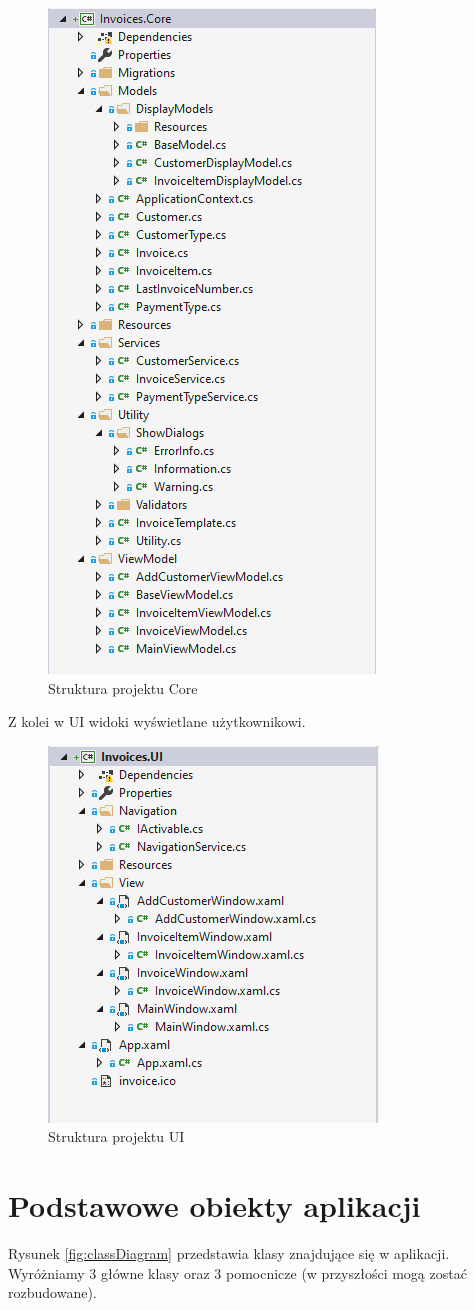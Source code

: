 \begin{figure}[ht!]
\centering
  \includegraphics[width=0.5\linewidth]{Rysunki/core.png}
  \caption{Struktura projektu Core}
  \label{fig:Core}
\end{figure}

Z kolei w UI widoki wyświetlane użytkownikowi.

\begin{figure}[ht!]
\centering
  \includegraphics[width=0.5\linewidth]{Rysunki/ui.png}
  \caption{Struktura projektu UI}
  \label{fig:UI}
\end{figure}

\section{Podstawowe obiekty aplikacji\label{AppObjects}}
Rysunek \ref{fig:classDiagram} przedstawia klasy znajdujące się w aplikacji. Wyróżniamy 3 główne klasy oraz 3 pomocnicze (w przyszłości mogą zostać rozbudowane). 


